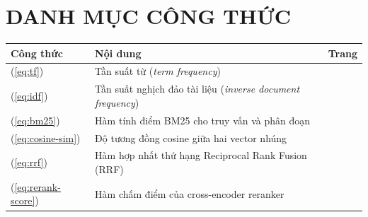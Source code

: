 \documentclass[../DoAn.tex]{subfiles}
\begin{document}
\chapter*{DANH MỤC CÔNG THỨC}

\begin{center}
\renewcommand{\arraystretch}{1.2}
\begin{tabular}{|p{}|p{}|>{\centering\arraybackslash}p{}|}
\hline
\textbf{Công thức} & \textbf{Nội dung} & \textbf{Trang} \\
\hline
(\ref{eq:tf}) & Tần suất từ (\textit{term frequency}) & \pageref{eq:tf} \\
\hline
(\ref{eq:idf}) & Tần suất nghịch đảo tài liệu (\textit{inverse document frequency}) & \pageref{eq:idf} \\
\hline
(\ref{eq:bm25}) & Hàm tính điểm BM25 cho truy vấn và phân đoạn & \pageref{eq:bm25} \\
\hline
(\ref{eq:cosine-sim}) & Độ tương đồng cosine giữa hai vector nhúng & \pageref{eq:cosine-sim} \\
\hline
(\ref{eq:rrf}) & Hàm hợp nhất thứ hạng Reciprocal Rank Fusion (RRF) & \pageref{eq:rrf} \\
\hline
(\ref{eq:rerank-score}) & Hàm chấm điểm của cross-encoder reranker & \pageref{eq:rerank-score} \\
\hline
\end{tabular}
\end{center}
\end{document}
